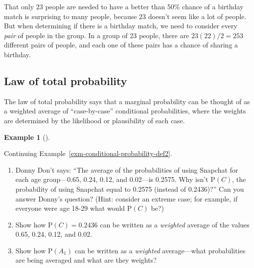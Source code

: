 \documentclass[
  letterpaper,
  DIV=11,
  numbers=noendperiod]{scrreprt}
\providecommand{\tightlist}{%
  \setlength{\itemsep}{0pt}\setlength{\parskip}{0pt}}
\theoremstyle{plain}
\theoremstyle{definition}
\newtheorem{example}{Example}[chapter]
\theoremstyle{definition}
\theoremstyle{definition}
\theoremstyle{remark}
\begin{document}
That only 23 people are needed to have a better than 50\% chance of a
birthday match is surprising to many people, because 23 doesn't seem
like a lot of people. But when determining if there is a birthday match,
we need to consider every \emph{pair} of people in the group. In a group
of 23 people, there are \(23(22)/2 = 253\) different pairs of people,
and each one of these pairs has a chance of sharing a birthday.

\subsection{Law of total probability}\label{law-of-total-probability}

The law of total probability says that a marginal probability can be
thought of as a weighted average of ``case-by-case'' conditional
probabilities, where the weights are determined by the likelihood or
plausibility of each case.

\begin{tcolorbox}[enhanced jigsaw, opacityback=0, left=2mm, colframe=quarto-callout-note-color-frame, toprule=.15mm, breakable, colback=white, leftrule=.75mm, arc=.35mm, rightrule=.15mm, bottomrule=.15mm]

\begin{example}[]\protect\hypertarget{exm-conditional-probability-def-ltp}{}\label{exm-conditional-probability-def-ltp}

Continuing Example~\ref{exm-conditional-probability-def2}.

\begin{enumerate}
\def\labelenumi{\arabic{enumi}.}
\tightlist
\item
  Donny Don't says: ``The average of the probabilities of using Snapchat
  for each age group---0.65, 0.24, 0.12, and 0.02---is 0.2575. Why isn't
  \(\textrm{P}(C)\), the probability of using Snapchat equal to 0.2575
  (instead of 0.2436)?'' Can you answer Donny's question? (Hint:
  consider an extreme case; for example, if everyone were age 18-29 what
  would \(\textrm{P}(C)\) be?)
\item
  Show how \(\textrm{P}(C) = 0.2436\) can be written as a
  \emph{weighted} average of the values 0.65, 0.24, 0.12, and 0.02.
\item
  Show how \(\textrm{P}(A_1)\) can be written as a \emph{weighted}
  average---what probabilities are being averaged and what are they
  weights?
\end{enumerate}

\end{example}

\end{tcolorbox}
\end{document}

